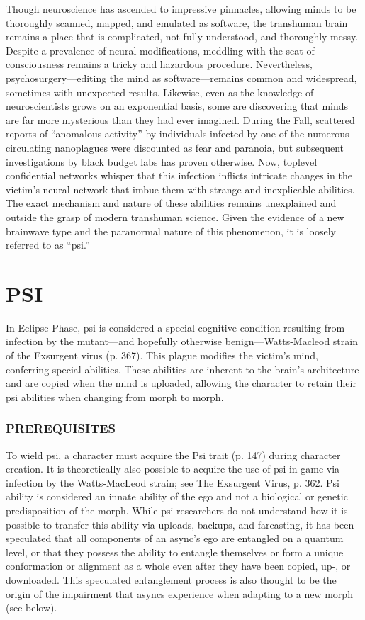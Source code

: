 \newpage

Though neuroscience has ascended to impressive
pinnacles, allowing minds to be thoroughly scanned,
mapped, and emulated as software, the transhuman
brain remains a place that is complicated, not fully
understood, and thoroughly messy. Despite a prevalence
of neural modifications, meddling with the seat
of consciousness remains a tricky and hazardous
procedure. Nevertheless, psychosurgery—editing the
mind as software—remains common and widespread,
sometimes with unexpected results.
Likewise, even as the knowledge of neuroscientists
grows on an exponential basis, some are discovering
that minds are far more mysterious than they had ever
imagined. During the Fall, scattered reports of “anomalous
activity” by individuals infected by one of the
numerous circulating nanoplagues were discounted
as fear and paranoia, but subsequent investigations
by black budget labs has proven otherwise. Now, toplevel
confidential networks whisper that this infection
inflicts intricate changes in the victim’s neural network
that imbue them with strange and inexplicable abilities.
The exact mechanism and nature of these abilities
remains unexplained and outside the grasp of modern
transhuman science. Given the evidence of a new
brainwave type and the paranormal nature of this
phenomenon, it is loosely referred to as “psi.”

\section{PSI}
In Eclipse Phase, psi is considered a special cognitive
condition resulting from infection by the mutant—and
hopefully otherwise benign—Watts-Macleod strain
of the Exsurgent virus (p. 367). This plague modifies
the victim’s mind, conferring special abilities. These
abilities are inherent to the brain’s architecture and
are copied when the mind is uploaded, allowing the
character to retain their psi abilities when changing
from morph to morph.

\subsubsection{PREREQUISITES}

To wield psi, a character must acquire the Psi trait (p.
147) during character creation. It is theoretically also
possible to acquire the use of psi in game via infection
by the Watts-MacLeod strain; see The Exsurgent
Virus, p. 362.
Psi ability is considered an innate ability of the
ego and not a biological or genetic predisposition of
the morph. While psi researchers do not understand
how it is possible to transfer this ability via uploads,
backups, and farcasting, it has been speculated that
all components of an async’s ego are entangled on a
quantum level, or that they possess the ability to entangle
themselves or form a unique conformation or
alignment as a whole even after they have been copied,
up-, or downloaded. This speculated entanglement
process is also thought to be the origin of the impairment
that asyncs experience when adapting to a new
morph (see below).

